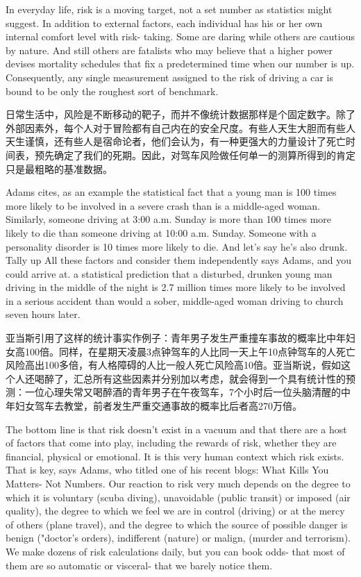\documentclass[cs4size, a4paper,12pt]{article}
\newcounter{numpar}
\newcommand*{\newpar}{\numpar{}}
\begin{document}
\newpar In everyday life, risk is a moving target, not a set number as statistics might suggest.
In addition to external factors, each individual has his or her own internal comfort level with risk- taking. Some are daring while others are cautious by nature. And still others are fatalists who may believe that a higher power devises mortality schedules that fix a predetermined time when our number is up. Consequently, any single measurement assigned to the risk of driving a car is bound to be only the roughest sort of benchmark.

日常生活中，风险是不断移动的靶子，而并不像统计数据那样是个固定数字。除了外部因素外，每个人对于冒险都有自己内在的安全尺度。有些人天生大胆而有些人天生谨慎，还有些人是宿命论者，他们会认为，有一种更强大的力量设计了死亡时间表，预先确定了我们的死期。因此，对驾车风险做任何单一的测算所得到的肯定只是最粗略的基准数据。

\newpar Adams cites, as an example the statistical fact that a young man is 100 times more likely to be involved in a severe crash than is a middle-aged woman. Similarly, someone driving at 3:00 a.m. Sunday is more than 100 times more likely to die than someone driving at 10:00 a.m. Sunday. Someone with a personality disorder is 10 times more likely to die. And let's say he's also drunk. Tally up All these factors and consider them independently says Adams, and you could arrive at. a statistical prediction that a disturbed, drunken young man driving in the middle of the night is 2.7 million times more likely to be involved in a serious accident than would a sober, middle-aged woman driving to church seven hours later.

亚当斯引用了这样的统计事实作例子：青年男子发生严重撞车事故的概率比中年妇女高100倍。同样，在星期天凌晨3点钟驾车的人比同一天上午10点钟驾车的人死亡风险高出100多倍，有人格障碍的人比一般人死亡风险高10倍。亚当斯说，假如这个人还喝醉了，汇总所有这些因素并分别加以考虑，就会得到一个具有统计性的预测：一位心理失常又喝醉酒的青年男子在午夜驾车，7个小时后一位头脑清醒的中年妇女驾车去教堂，前者发生严重交通事故的概率比后者高270万倍。

\newpar The bottom line is that risk doesn't exist in a vacuum and that there are a host of factors that come into play, including the rewards of risk, whether they are financial, physical or emotional. It is this very human context which risk exists. That is key, says Adams, who titled one of his recent blogs: What Kills You Matters- Not Numbers. Our reaction to risk very much depends on the degree to which it is voluntary (scuba diving), unavoidable (public transit) or imposed (air quality), the degree to which we feel we are in control (driving) or at the mercy of others (plane travel), and the degree to which the source of possible danger is benign ("doctor's orders), indifferent (nature) or malign, (murder and terrorism). We make dozens of risk calculations daily, but you can book odds- that most of them are so automatic or visceral- that we barely notice them.
\end{document}
